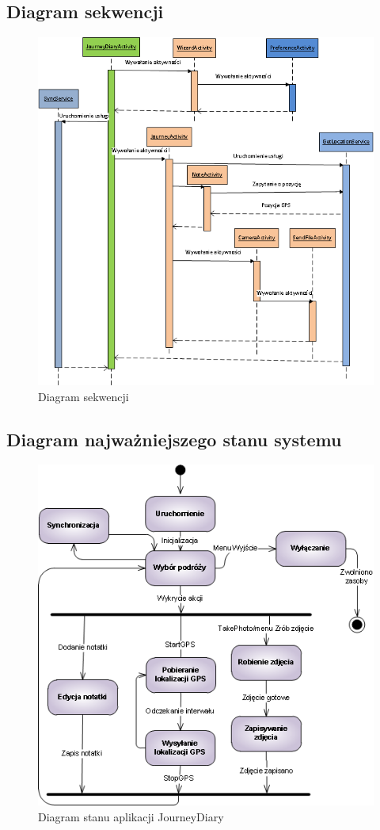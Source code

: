 \documentclass[11pt,a4paper]{article}
\begin{document}
\subsection {Diagram sekwencji}
\begin{figure}[h]
    \includegraphics[scale=0.7]{sequence.png}
    \caption{Diagram sekwencji}
 \end{figure}

\newpage
\subsection {Diagram najważniejszego stanu systemu}
\begin{figure}[ht]
    \includegraphics[scale=0.6]{state.png}
    \caption{Diagram stanu aplikacji JourneyDiary}
 \end{figure}
\end{document}
